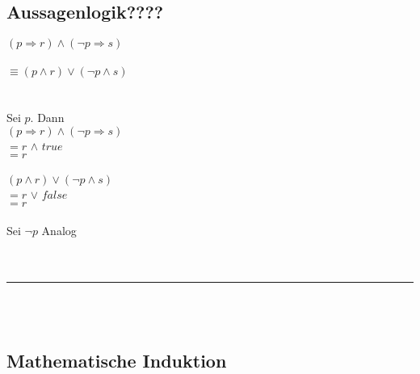 \documentclass[18pt,a4paper]{article}
\newcommand{\tab}{\hspace*{2em}}
\begin{document}
\subsection{Aussagenlogik????}

$(p\Rightarrow r)\wedge (\neg p \Rightarrow s)$\\
\\
$\equiv (p\wedge r) \vee (\neg p\wedge s)$\\
\\
\\
Sei $p$. Dann\\
\tab $(p\Rightarrow r)\wedge (\neg p \Rightarrow s)$\\
$=$\tab $r$ \:\:\:\:\:$\wedge$ \:\:\:$true$\\
$=$\tab $r$\\
\\
\tab $(p\wedge r)\vee (\neg p \wedge s)$\\
$=$\tab $r$ \:\:\:\:\:$\vee$ \:\:\:$false$\\
$=$\tab $r$\\
\\
Sei $\neg p$ Analog\\
\\
\\
\rule{\textwidth}{0.4mm}\\
\\

\subsection{Mathematische Induktion}
\end{document}
